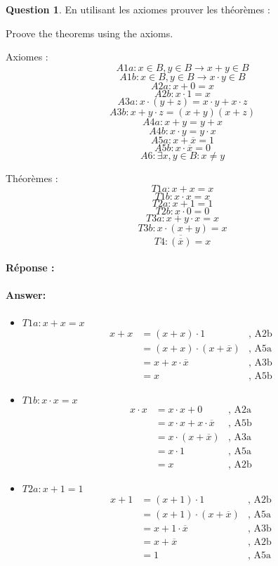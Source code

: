 \documentclass[11pt,a4paper]{article}
\theoremstyle{definition}%
\newtheorem{Q}{Question}[] %
\newcommand{\reponse}[1]{%
	\ifthenelse {\boolean{corrige}} {\fr{\paragraph{Réponse :}}\en{\paragraph{Answer:}} \color{darkblue}   #1\color{black}} {}
 }
\newcommand{\fr}[1]{
 	\ifthenelse {\boolean{fr}} {#1} {}
 }
\newcommand{\en}[1]{
 	\ifthenelse {\boolean{en}} {#1} {}
 }
\begin{document}
\begin{Q}
\fr{En utilisant les axiomes prouver les théorèmes :}
\en{Proove the theorems using the axioms.}

\begin{minipage}[t]{0.5\linewidth}
	\centering Axiomes :
	$$A1a : x \in B, y \in B \rightarrow x+y \in B$$
	$$A1b : x \in B, y \in B \rightarrow x \cdot y \in B$$
	$$A2a : x+0 = x$$
	$$A2b : x \cdot 1 = x$$
	$$A3a : x \cdot (y+z) = x \cdot y+x \cdot z$$
	$$A3b : x+y \cdot z = (x+y)(x+z)$$
	$$A4a : x+y = y+x$$
	$$A4b : x \cdot y = y \cdot x$$
	$$A5a : x+\overline{x} = 1$$
	$$A5b : x \cdot \overline{x} = 0$$
	$$A6 : \exists x, y \in B : x \neq y$$
\end{minipage}
\begin{minipage}[t]{0.5\linewidth}
	\centering Théorèmes :
	$$T1a : x+x=x$$
	$$T1b : x \cdot x=x$$
	$$T2a : x+1=1$$
	$$T2b : x \cdot 0=0$$
	$$T3a : x+y \cdot x=x$$
	$$T3b : x \cdot (x+y)=x$$
	$$T4 : \overline{(\overline{x})}=x$$
\end{minipage}

\reponse{
\begin{itemize}
	\item $T1a : x+x=x$
	\begin{align*}
		x + x & = (x + x) \cdot 1&\mbox{, A2b}\\
		& = (x + x) \cdot (x + \overline{x})&\mbox{, A5a}\\
		& = x + x \cdot \overline{x}&\mbox{, A3b}\\
		& = x &\mbox{, A5b}
	\end{align*}

	\item $T1b : x \cdot x=x$
	\begin{align*}
		x \cdot x & = x \cdot x  + 0&\mbox{, A2a}\\
		& = x\cdot x + x \cdot \overline{x} &\mbox{, A5b}\\
		& = x \cdot (x + \overline{x}) &\mbox{, A3a} \\
		& = x \cdot 1&\mbox{, A5a}\\
		& = x&\mbox{, A2b}
	\end{align*}

	\item $T2a : x+1=1$
	\begin{align*}
		x + 1 & = (x+1) \cdot 1&\mbox{, A2b}\\
		& = (x+1) \cdot (x+\overline{x})&\mbox{, A5a}\\
		& = x + 1 \cdot \overline{x} &\mbox{, A3b}\\
		& = x + \overline{x} &\mbox{, A2b}\\
		& = 1 &\mbox{, A5a}
	\end{align*}


\end{itemize}}
\end{Q}
\end{document}
